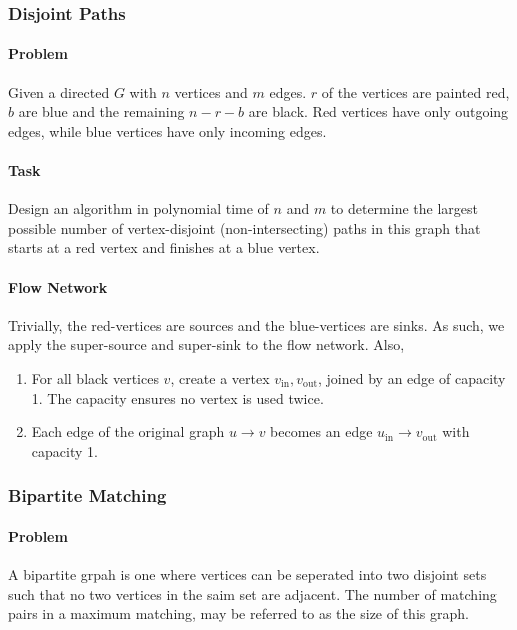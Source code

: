 \subsubsection{Disjoint Paths}

\paragraph{Problem}
Given a directed \(G\) with \(n\) vertices and \(m\) edges.
\(r\) of the vertices are painted red,  \(b\) are blue and
the remaining  \(n - r - b\) are black. Red vertices
have only outgoing edges, while blue vertices have only incoming edges.

\paragraph{Task}
Design an algorithm in polynomial time of \(n\) and \(m\)
to determine the largest possible number of vertex-disjoint
(non-intersecting) paths in this graph that starts
at a red vertex and finishes at a blue vertex.

\paragraph{Flow Network}
Trivially, the red-vertices are sources and the blue-vertices are sinks.
As such, we apply the super-source and super-sink to the flow network.
Also,
\begin{enumerate}
  \item For all black vertices \(v\), create a vertex
    \(v_{\mathrm{in}}, v_{\mathrm{out}}\), joined by an edge of capacity 1.
    The capacity ensures no vertex is used twice.
  \item Each edge of the original graph \(u \to  v\) becomes an edge
    \(u_{\mathrm{in}} \to v_{\mathrm{out}}\) with capacity 1.
\end{enumerate}

\subsubsection{Bipartite Matching}

\paragraph{Problem}
A bipartite grpah is one where vertices can be seperated into two disjoint sets such that
no two vertices in the saim set are adjacent.
The number of matching pairs in a maximum matching, may be referred to as the size
of this graph.

